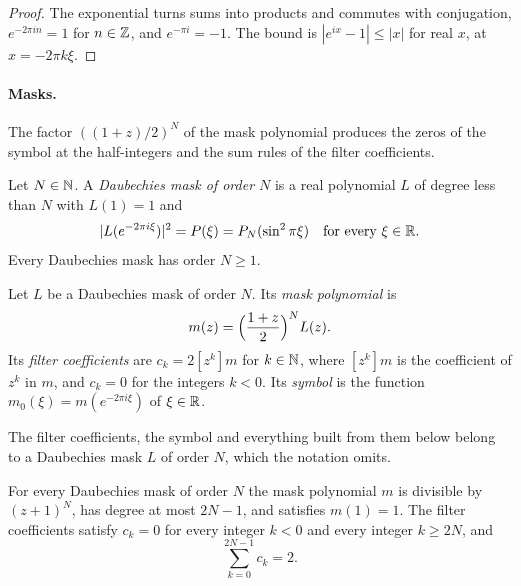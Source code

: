 \begin{proof}
\leanok
The exponential turns sums into products and commutes with conjugation, $e^{-2\pi i n} = 1$
for $n \in \mathbb{Z}$, and $e^{-\pi i} = -1$. The bound is $|e^{ix} - 1| \leq |x|$ for real $x$, at
$x = -2\pi k \xi$.
\end{proof}

\paragraph{Masks.}
The factor $((1 + z)/2)^N$ of the mask polynomial produces the zeros of the symbol at the
half-integers and the sum rules of the filter coefficients.

\begin{definition}
\label{def:daub-mask}
\leanok
{}
Let $N \in \mathbb{N}$. A \emph{Daubechies mask of order $N$} is a real polynomial $L$ of degree less
than $N$ with $L(1) = 1$ and
\[
  |L(e^{-2\pi i \xi})|^2 = P(\xi) = P_N(\sin^2 \pi\xi) \quad\text{for every } \xi \in \mathbb{R} .
\]
Every Daubechies mask has order $N \geq 1$.
\end{definition}

\begin{definition}
\label{def:daub-symbol}
\leanok
{}
Let $L$ be a Daubechies mask of order $N$. Its \emph{mask polynomial} is
\[
  m(z) = \Bigl(\frac{1 + z}{2}\Bigr)^N L(z) .
\]
Its \emph{filter coefficients} are $c_k = 2 [z^k] m$ for $k \in \mathbb{N}$, where $[z^k] m$ is the
coefficient of $z^k$ in $m$, and $c_k = 0$ for the integers $k < 0$. Its \emph{symbol} is the
function $m_0(\xi) = m(e^{-2\pi i \xi})$ of $\xi \in \mathbb{R}$.
\end{definition}

The filter coefficients, the symbol and everything built from them below belong to a Daubechies
mask $L$ of order $N$, which the notation omits.

\begin{lemma}
\label{lem:daub-mask-poly}
\leanok
{}
For every Daubechies mask of order $N$ the mask polynomial $m$ is divisible by $(z + 1)^N$, has
degree at most $2N - 1$, and satisfies $m(1) = 1$. The filter coefficients satisfy $c_k = 0$ for
every integer $k < 0$ and every integer $k \geq 2N$, and
\[
  \sum_{k=0}^{2N-1} c_k = 2 .
\]
\end{lemma}

